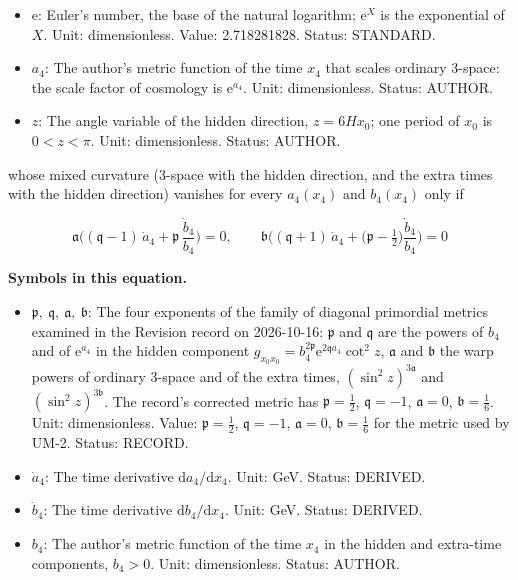 \documentclass[
  10pt,
]{article}
\providecommand{\tightlist}{%
  \setlength{\itemsep}{0pt}\setlength{\parskip}{0pt}}
\begin{document}
\begin{itemize}
  Value: \(\mathfrak{p} = \frac12\), \(\mathfrak{q} = -1\),
  \(\mathfrak{a} = 0\), \(\mathfrak{b} = \frac16\) for the metric used
  by UM-2. Status: RECORD.
\item
  \(\mathrm{e}\): Euler's number, the base of the natural logarithm;
  \(\mathrm{e}^{X}\) is the exponential of \(X\). Unit: dimensionless.
  Value: 2.718281828. Status: STANDARD.
\item
  \(a_4\): The author's metric function of the time \(x_4\) that scales
  ordinary 3-space: the scale factor of cosmology is
  \(\mathrm{e}^{a_4}\). Unit: dimensionless. Status: AUTHOR.
\item
  \(z\): The angle variable of the hidden direction, \(z = 6Hx_0\); one
  period of \(x_0\) is \(0 < z < \pi\). Unit: dimensionless. Status:
  AUTHOR.
\end{itemize}

whose mixed curvature (3-space with the hidden direction, and the extra
times with the hidden direction) vanishes for every \(a_4(x_4)\) and
\(b_4(x_4)\) only if

\[
\mathfrak{a}\Big((\mathfrak{q} - 1)\,\dot a_4 + \mathfrak{p}\,\frac{\dot b_4}{b_4}\Big) = 0,\qquad
\mathfrak{b}\Big((\mathfrak{q} + 1)\,\dot a_4 + \big(\mathfrak{p} - \tfrac12\big)\frac{\dot b_4}{b_4}\Big) = 0
\]

\textbf{Symbols in this equation.}

\begin{itemize}
\tightlist
\item
  \(\mathfrak{p},\ \mathfrak{q},\ \mathfrak{a},\ \mathfrak{b}\): The
  four exponents of the family of diagonal primordial metrics examined
  in the Revision record on 2026-10-16: \(\mathfrak{p}\) and
  \(\mathfrak{q}\) are the powers of \(b_4\) and of \(\mathrm{e}^{a_4}\)
  in the hidden component
  \(g_{x_0x_0} = b_4^{2\mathfrak{p}}\mathrm{e}^{2\mathfrak{q}a_4}\cot^2z\),
  \(\mathfrak{a}\) and \(\mathfrak{b}\) the warp powers of ordinary
  3-space and of the extra times, \((\sin^2z)^{3\mathfrak{a}}\) and
  \((\sin^2z)^{3\mathfrak{b}}\). The record's corrected metric has
  \(\mathfrak{p} = \frac12\), \(\mathfrak{q} = -1\),
  \(\mathfrak{a} = 0\), \(\mathfrak{b} = \frac16\). Unit: dimensionless.
  Value: \(\mathfrak{p} = \frac12\), \(\mathfrak{q} = -1\),
  \(\mathfrak{a} = 0\), \(\mathfrak{b} = \frac16\) for the metric used
  by UM-2. Status: RECORD.
\item
  \(\dot a_4\): The time derivative \(\mathrm{d}a_4/\mathrm{d}x_4\).
  Unit: GeV. Status: DERIVED.
\item
  \(\dot b_4\): The time derivative \(\mathrm{d}b_4/\mathrm{d}x_4\).
  Unit: GeV. Status: DERIVED.
\item
  \(b_4\): The author's metric function of the time \(x_4\) in the
  hidden and extra-time components, \(b_4 > 0\). Unit: dimensionless.
  Status: AUTHOR.
\end{itemize}
\end{document}
